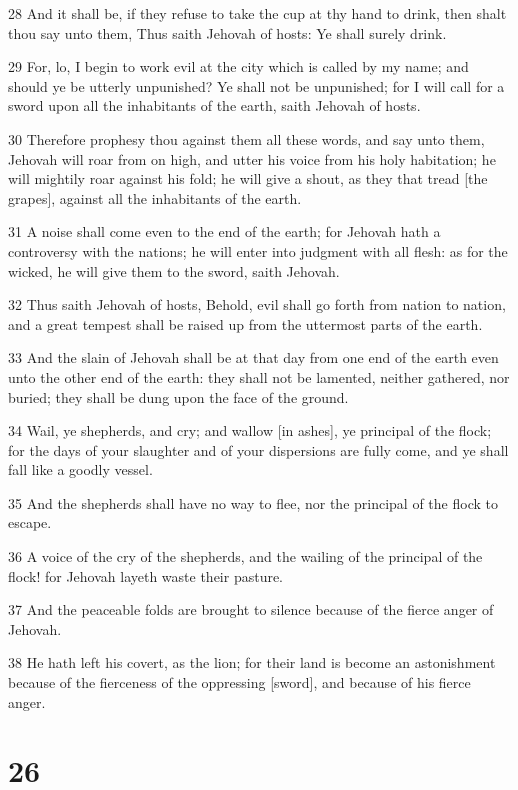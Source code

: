 \par 28 And it shall be, if they refuse to take the cup at thy hand to drink, then shalt thou say unto them, Thus saith Jehovah of hosts: Ye shall surely drink.
\par 29 For, lo, I begin to work evil at the city which is called by my name; and should ye be utterly unpunished? Ye shall not be unpunished; for I will call for a sword upon all the inhabitants of the earth, saith Jehovah of hosts.
\par 30 Therefore prophesy thou against them all these words, and say unto them, Jehovah will roar from on high, and utter his voice from his holy habitation; he will mightily roar against his fold; he will give a shout, as they that tread [the grapes], against all the inhabitants of the earth.
\par 31 A noise shall come even to the end of the earth; for Jehovah hath a controversy with the nations; he will enter into judgment with all flesh: as for the wicked, he will give them to the sword, saith Jehovah.
\par 32 Thus saith Jehovah of hosts, Behold, evil shall go forth from nation to nation, and a great tempest shall be raised up from the uttermost parts of the earth.
\par 33 And the slain of Jehovah shall be at that day from one end of the earth even unto the other end of the earth: they shall not be lamented, neither gathered, nor buried; they shall be dung upon the face of the ground.
\par 34 Wail, ye shepherds, and cry; and wallow [in ashes], ye principal of the flock; for the days of your slaughter and of your dispersions are fully come, and ye shall fall like a goodly vessel.
\par 35 And the shepherds shall have no way to flee, nor the principal of the flock to escape.
\par 36 A voice of the cry of the shepherds, and the wailing of the principal of the flock! for Jehovah layeth waste their pasture.
\par 37 And the peaceable folds are brought to silence because of the fierce anger of Jehovah.
\par 38 He hath left his covert, as the lion; for their land is become an astonishment because of the fierceness of the oppressing [sword], and because of his fierce anger.

\chapter{26}

